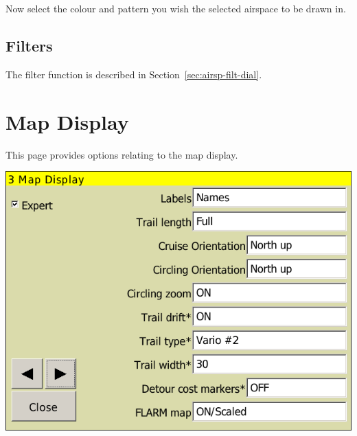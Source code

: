 Now select the colour and pattern you wish the selected airspace to be drawn in.


\subsection*{Filters}
The filter function is described in Section~\ref{sec:airsp-filt-dial}.




\clearpage
\section{Map Display}\label{sec:map-display}

This page provides options relating to the map display.

\begin{center}
\includegraphics[angle=0,width=0.8\linewidth,keepaspectratio='true']{figures/config-map.png}
\end{center}

